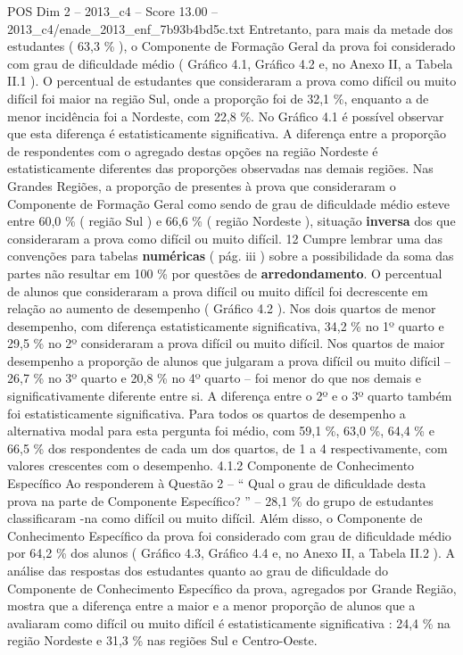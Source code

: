 \begin{textsample}{POS Dim 2 – 2013\_c4 – Score 13.00 – 2013\_c4/enade\_2013\_enf\_7b93b4bd5c.txt}
Entretanto, para mais da metade dos estudantes ( 63,3 \% ), o Componente de Formação Geral da prova foi considerado com grau de dificuldade médio ( Gráfico 4.1, Gráfico 4.2 e, no Anexo II, a Tabela II.1 ).
O percentual de estudantes que consideraram a prova como difícil ou muito difícil foi maior na região Sul, onde a proporção foi de 32,1 \%, enquanto a de menor incidência foi a Nordeste, com 22,8 \%.
No Gráfico 4.1 é possível observar que esta diferença é estatisticamente significativa.
A diferença entre a proporção de respondentes com o agregado destas opções na região Nordeste é estatisticamente diferentes das proporções observadas nas demais regiões.
Nas Grandes Regiões, a proporção de presentes à prova que consideraram o Componente de Formação Geral como sendo de grau de dificuldade médio esteve entre 60,0 \% ( região Sul ) e 66,6 \% ( região Nordeste ), situação \textbf{inversa} dos que consideraram a prova como difícil ou muito difícil. 12 Cumpre lembrar uma das convenções para tabelas \textbf{numéricas} ( pág. iii ) sobre a possibilidade da soma das partes não resultar em 100 \% por questões de \textbf{arredondamento}.
O percentual de alunos que consideraram a prova difícil ou muito difícil foi decrescente em relação ao aumento de desempenho ( Gráfico 4.2 ).
Nos dois quartos de menor desempenho, com diferença estatisticamente significativa, 34,2 \% no 1º quarto e 29,5 \% no 2º consideraram a prova difícil ou muito difícil.
Nos quartos de maior desempenho a proporção de alunos que julgaram a prova difícil ou muito difícil – 26,7 \% no 3º quarto e 20,8 \% no 4º quarto – foi menor do que nos demais e significativamente diferente entre si.
A diferença entre o 2º e o 3º quarto também foi estatisticamente significativa.
Para todos os quartos de desempenho a alternativa modal para esta pergunta foi médio, com 59,1 \%, 63,0 \%, 64,4 \% e 66,5 \% dos respondentes de cada um dos quartos, de 1 a 4 respectivamente, com valores crescentes com o desempenho. 4.1.2 Componente de Conhecimento Específico Ao responderem à Questão 2 – “ Qual o grau de dificuldade desta prova na parte de Componente Específico? ” – 28,1 \% do grupo de estudantes classificaram -na como difícil ou muito difícil.
Além disso, o Componente de Conhecimento Específico da prova foi considerado com grau de dificuldade médio por 64,2 \% dos alunos ( Gráfico 4.3, Gráfico 4.4 e, no Anexo II, a Tabela II.2 ).
A análise das respostas dos estudantes quanto ao grau de dificuldade do Componente de Conhecimento Específico da prova, agregados por Grande Região, mostra que a diferença entre a maior e a menor proporção de alunos que a avaliaram como difícil ou muito difícil é estatisticamente significativa : 24,4 \% na região Nordeste e 31,3 \% nas regiões Sul e Centro-Oeste.

\end{textsample}
